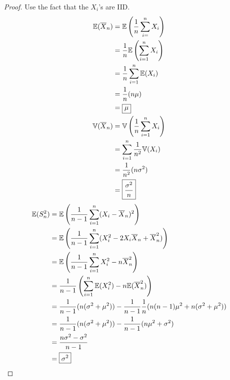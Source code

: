 \documentclass[a4paper]{article}
\begin{document}
\newpage
\begin{proof}[Proof] 
Use the fact that the \(X_{i}\)'s are \textsf{IID}.
\begin{align*}
	\mathbb{E}(\overline{X}_{n}) & = \mathbb{E} \left( \frac{1}{n} \sum_{i=}^{n} X_{i} \right)  \\
	 & = \frac{1}{n} \mathbb{E} \left( \sum_{i=1}^{n} X_{i} \right)  \\ 
	 & = \frac{1}{n} \sum_{i=1}^{n} \mathbb{E}(X_{i}) \\
	 & = \frac{1}{n} (n \mu) \\
	 & = \boxed{\mu} \\
	\mathbb{V}(\overline{X}_{n}) & = \mathbb{V} \left( \frac{1}{n} \sum_{i=1}^{n} X_{i} \right) \\
	 & = \sum_{i=1}^{n} \frac{1}{n^{2}} \mathbb{V}(X_{i}) \\
	 & = \frac{1}{n^{2}} (n \sigma^{2}) \\
	 & = \boxed{\frac{\sigma^{2}}{n}} 
\end{align*}
\begin{align*}
	\mathbb{E}(S^{2}_{n}) & = \mathbb{E} \left( \frac{1}{n-1} \sum_{i=1}^{n} (X_{i} - \overline{X}_{n})^{2} \right)  \\
	 & = \mathbb{E} \left( \frac{1}{n-1} \sum_{i=1}^{n} (X_{i}^{2} - 2X_{i}\overline{X}_{n} + \overline{X}_{n}^{2}) \right)  \\ 
	 & = \mathbb{E} \left( \frac{1}{n-1} \sum_{i=1}^{n} X_{i}^{2} - n \overline{X}_{n}^{2} \right) \\
	 & = \frac{1}{n-1} \left( \sum_{i=1}^{n} \mathbb{E}(X_{i}^{2}) - n \mathbb{E}(\overline{X}_{n}^{2}) \right) \\
	 & = \frac{1}{n-1}(n(\sigma^{2} + \mu^{2})) - \frac{1}{n-1}\frac{1}{n}(n(n-1) \mu^{2} + n(\sigma^{2} + \mu^{2})) \\
	 & = \frac{1}{n-1}(n(\sigma^{2} + \mu^{2})) - \frac{1}{n-1}(n \mu^{2} + \sigma^{2}) \\
	 & = \frac{n \sigma^{2} - \sigma^{2}}{n-1} \\
	 & = \boxed{\sigma^{2}}
\end{align*}
\end{proof}

\end{document}
